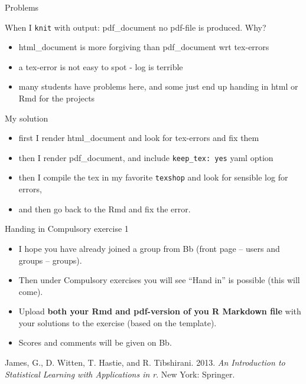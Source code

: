 \documentclass[
  10pt,
  ignorenonframetext,
]{beamer}
\providecommand{\tightlist}{%
  \setlength{\itemsep}{0pt}\setlength{\parskip}{0pt}}
\newlength{\cslhangindent}
\newlength{\cslentryspacingunit} %
\newenvironment{CSLReferences}[2] %
 {%
  \setlength{\parindent}{0pt}
  \ifodd #1
  \let\oldpar\par
  \def\par{\hangindent=\cslhangindent\oldpar}
  \fi
  \setlength{\parskip}{#2\cslentryspacingunit}
 }%
 {}
\begin{document}
\begin{frame}[fragile]{Problems}
\protect\hypertarget{problems}{}
\begin{block}{When I \texttt{knit} with output: pdf\_document no
pdf-file is produced. Why?}
\protect\hypertarget{when-i-knit-with-output-pdf_document-no-pdf-file-is-produced.-why}{}
\begin{itemize}
\tightlist
\item
  html\_document is more forgiving than pdf\_document wrt tex-errors
\item
  a tex-error is not easy to spot - log is terrible
\item
  many students have problems here, and some just end up handing in html
  or Rmd for the projects
\end{itemize}

My solution

\begin{itemize}
\tightlist
\item
  first I render html\_document and look for tex-errors and fix them
\item
  then I render pdf\_document, and include \texttt{keep\_tex:\ yes} yaml
  option
\item
  then I compile the tex in my favorite \texttt{texshop} and look for
  sensible log for errors,
\item
  and then go back to the Rmd and fix the error.
\end{itemize}
\end{block}
\end{frame}

\begin{frame}{Handing in Compulsory exercise 1}
\protect\hypertarget{handing-in-compulsory-exercise-1}{}
\begin{itemize}
\item
  I hope you have already joined a group from Bb (front page -- users
  and groups -- groups).
\item
  Then under Compulsory exercises you will see ``Hand in'' is possible
  (this will come).
\item
  Upload \textbf{both your Rmd and pdf-version of you R Markdown file}
  with your solutions to the exercise (based on the template).
\item
  Scores and comments will be given on Bb.
\end{itemize}
\end{frame}

\begin{frame}
\hypertarget{refs}{}
\begin{CSLReferences}{1}{0}
\leavevmode{}%
James, G., D. Witten, T. Hastie, and R. Tibshirani. 2013. \emph{An
Introduction to Statistical Learning with Applications in r}. New York:
Springer.

\end{CSLReferences}
\end{frame}
\end{document}
